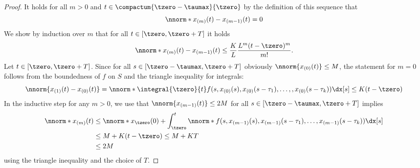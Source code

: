 \begin{proof}
        It holds for all $m>0$ and $t\in \compactum{\tzero-\taumax}{\tzero}$ by the definition of this sequence that
        \begin{equation*}
            \nnorm*{x_{(m)}(t)-x_{(m-1)}(t)}=0
        \end{equation*}
        We show by induction over $m$ that for all $t\in [\tzero,\tzero+T]$ it holds
        \begin{equation*}
            \nnorm*{x_{(m)}(t)-x_{(m-1)}(t)} \leq \frac{K}{L}\frac{L^m (t-\tzero)^m}{m!}.
        \end{equation*}
        Let $t\in [\tzero,\tzero+T]$. Since for all $s\in [\tzero-\taumax,\tzero+T]$ obviously $\nnorm{x_{(0)}(t)}\leq M$, the statement for $m=0$ follows from the boundedness of $f$ on $S$ and the triangle inequality for integrals:
        \begin{equation*}
            \nnorm{x_{(1)}(t)-x_{(0)}(t)} = \nnorm*{\integral{\tzero}{t} f(s,x_{(0)}(s),x_{(0)}(s-\tau_1),\ldots,,x_{(0)}(s-\tau_k))\dx[s]} \leq K(t-\tzero)
        \end{equation*}
        In the inductive step for any $m>0$, we use that $\nnorm{x_{(m-1)}(t)}\leq 2M$ for all $s\in [\tzero-\taumax,\tzero+T]$ implies
        \begin{align}\label{eq:bounded-xm}
            \nnorm*{x_{(m)}(t)} &\leq \nnorm*{x_\tzero(0)} + \int_\tzero^t \nnorm*{f(s,x_{(m-1)}(s),x_{(m-1)}(s-\tau_1),\ldots,x_{(m-1)}(s-\tau_k))}\dx[s] \nonumber \\
            &\leq M + K(t-\tzero) \leq M+KT \nonumber \\
            &\leq 2M
        \end{align}
        using the triangle inequality and the choice of $T$.


\end{proof}
